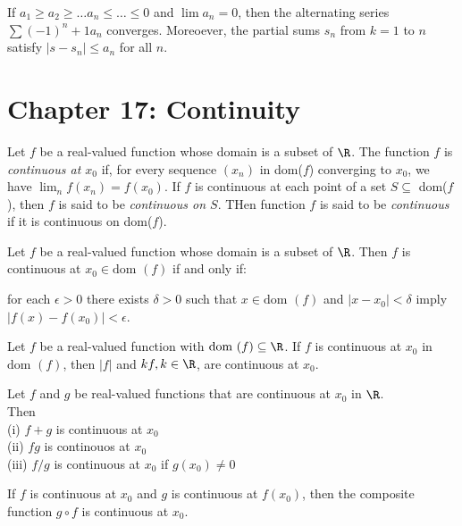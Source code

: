 \documentclass[twoside, 10pt]{article}
\newcommand{\dom}{\text{dom }}
\begin{document}
\begin{thm}
If $a_1 \geq a_2 \geq \ldots a_n \leq \ldots \leq 0$ and $\lim a_n = 0$, then the alternating series $\sum (-1)^n+1a_n$ converges. Moreoever, the partial sums $s_n$ from $k = 1$ to $n$ satisfy $|s-s_n| \leq a_n$ for all $n$.

\end{thm}
\section*{Chapter 17: Continuity}
\begin{defn}
Let $f$ be a real-valued function whose domain is a subset of $\R$. The function $f$ is \emph{continuous at $x_0$} if, for every sequence $(x_n)$ in dom($f$) converging to $x_0$, we have $\lim_nf(x_n)=f(x_0)$. If $f$ is continuous at each point of a set $S\subseteq $ dom($f$), then $f$ is said to be \emph{continuous on $S$}. THen function $f$ is said to be \emph{continuous} if it is continuous on dom($f$).
\end{defn}

\begin{thm}
Let $f$ be a real-valued function whose domain is a subset of $\R$. Then $f$ is continuous at $x_0\in\dom(f)$ if and only if:

for each $\epsilon > 0$ there exists $\delta > 0$ such that $x\in\dom(f)$ and $|x-x_0|<\delta$ imply $|f(x)-f(x_0)| < \epsilon$.
\end{thm}

\begin{thm}
Let $f$ be a real-valued function with $\dom(f) \subseteq \R$. If $f$ is continuous at $x_0$ in $\dom(f)$, then $|f|$ and $kf, k\in\R$, are continuous at $x_0$.
\end{thm}

\begin{thm}
Let $f$ and $g$ be real-valued functions that are continuous at $x_0$ in $\R$.\\
Then\\
    (i) $f+g$ is continuous at $x_0$\\
    (ii) $fg$ is continouos at $x_0$\\
    (iii) $f/g$ is continuous at $x_0$ if $g(x_0)\neq 0$
\end{thm}

\begin{thm}
If $f$ is continuous at $x_0$ and $g$ is continuous at $f(x_0)$, then the composite function $g\circ f$ is continuous at $x_0$.
\end{thm}
\end{document}
